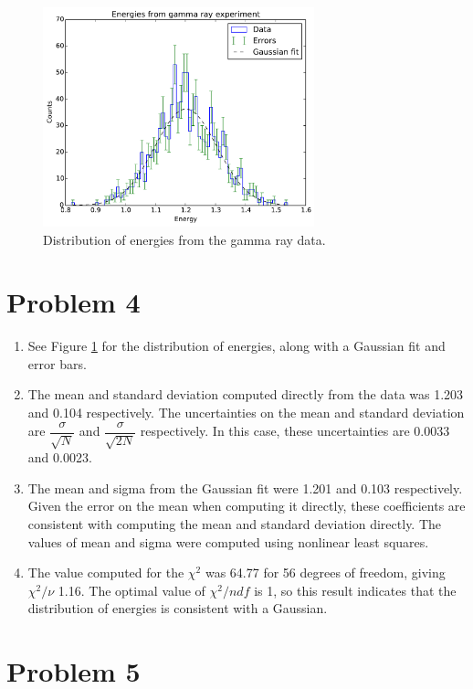 \documentclass[11pt,letterpaper]{article}
\begin{document}
\begin{figure}
    \centering
    \includegraphics[width=0.7\textwidth]{figures/problem4.pdf}
    \caption{Distribution of energies from the gamma ray data.}
    \label{prob4}
\end{figure}

\section*{Problem 4}

\begin{enumerate}
\item See Figure \ref{prob4} for the distribution of energies, along with a
    Gaussian fit and error bars.
\item The mean and standard deviation computed directly from the data was
    1.203 and 0.104 respectively. The uncertainties on the mean and standard
    deviation are $\dfrac{\sigma}{\sqrt{N}}$ and $\dfrac{\sigma}{\sqrt{2N}}$
    respectively. In this case, these uncertainties are 0.0033 and 0.0023.
\item The mean and sigma from the Gaussian fit were 1.201 and 0.103
    respectively. Given the error on the mean when computing it directly, these
    coefficients are consistent with computing the mean and standard deviation
    directly. The values of mean and sigma were computed using nonlinear least
    squares.
\item The value computed for the $\chi^2$ was 64.77 for 56 degrees of freedom,
    giving $\chi^2 / \nu$ 1.16. The optimal value of $\chi^2 / ndf$ is 1, so
    this result indicates that the distribution of energies is consistent with a
    Gaussian.
\end{enumerate}

\section*{Problem 5}
\end{document}
